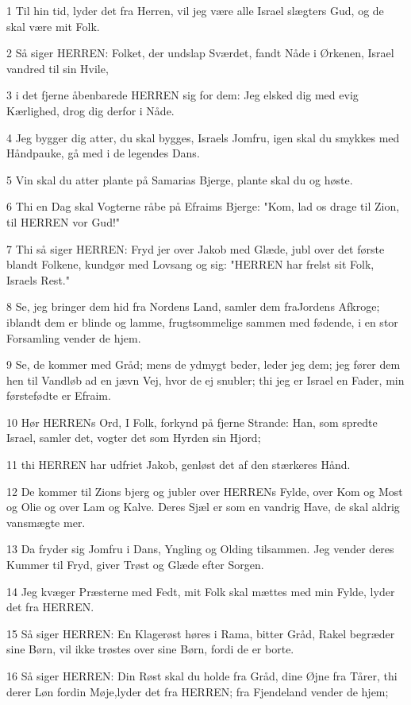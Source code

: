 \par 1 Til hin tid, lyder det fra Herren, vil jeg være alle Israel slægters Gud, og de skal være mit Folk.
\par 2 Så siger HERREN: Folket, der undslap Sværdet, fandt Nåde i Ørkenen, Israel vandred til sin Hvile,
\par 3 i det fjerne åbenbarede HERREN sig for dem: Jeg elsked dig med evig Kærlighed, drog dig derfor i Nåde.
\par 4 Jeg bygger dig atter, du skal bygges, Israels Jomfru, igen skal du smykkes med Håndpauke, gå med i de legendes Dans.
\par 5 Vin skal du atter plante på Samarias Bjerge, plante skal du og høste.
\par 6 Thi en Dag skal Vogterne råbe på Efraims Bjerge: "Kom, lad os drage til Zion, til HERREN vor Gud!"
\par 7 Thi så siger HERREN: Fryd jer over Jakob med Glæde, jubl over det første blandt Folkene, kundgør med Lovsang og sig: "HERREN har frelst sit Folk, Israels Rest."
\par 8 Se, jeg bringer dem hid fra Nordens Land, samler dem fraJordens Afkroge; iblandt dem er blinde og lamme, frugtsommelige sammen med fødende, i en stor Forsamling vender de hjem.
\par 9 Se, de kommer med Gråd; mens de ydmygt beder, leder jeg dem; jeg fører dem hen til Vandløb ad en jævn Vej, hvor de ej snubler; thi jeg er Israel en Fader, min førstefødte er Efraim.
\par 10 Hør HERRENs Ord, I Folk, forkynd på fjerne Strande: Han, som spredte Israel, samler det, vogter det som Hyrden sin Hjord;
\par 11 thi HERREN har udfriet Jakob, genløst det af den stærkeres Hånd.
\par 12 De kommer til Zions bjerg og jubler over HERRENs Fylde, over Kom og Most og Olie og over Lam og Kalve. Deres Sjæl er som en vandrig Have, de skal aldrig vansmægte mer.
\par 13 Da fryder sig Jomfru i Dans, Yngling og Olding tilsammen. Jeg vender deres Kummer til Fryd, giver Trøst og Glæde efter Sorgen.
\par 14 Jeg kvæger Præsterne med Fedt, mit Folk skal mættes med min Fylde, lyder det fra HERREN.
\par 15 Så siger HERREN: En Klagerøst høres i Rama, bitter Gråd, Rakel begræder sine Børn, vil ikke trøstes over sine Børn, fordi de er borte.
\par 16 Så siger HERREN: Din Røst skal du holde fra Gråd, dine Øjne fra Tårer, thi derer Løn fordin Møje,lyder det fra HERREN; fra Fjendeland vender de hjem;
